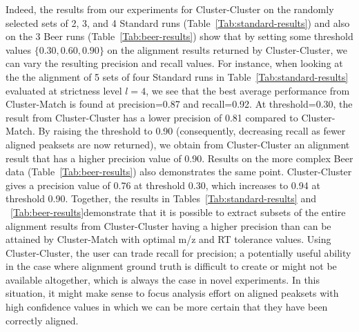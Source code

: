 Indeed, the results from our experiments for Cluster-Cluster on the randomly selected sets of 2, 3, and 4 Standard runs (Table~\ref{Tab:standard-results}) and also on the 3 Beer runs (Table~\ref{Tab:beer-results}) show that by setting some threshold values $\{0.30, 0.60, 0.90\}$ on the alignment results returned by Cluster-Cluster, we can vary the resulting precision and recall values. For instance, when looking at the the alignment of 5 sets of four Standard runs in Table~\ref{Tab:standard-results} evaluated at strictness level $l=4$, we see that the best average performance from Cluster-Match is found at precision=0.87 and recall=0.92. At threshold=0.30, the result from Cluster-Cluster has a lower precision of 0.81 compared to Cluster-Match. By raising the threshold to 0.90 (consequently, decreasing recall as fewer aligned peaksets are now returned), we obtain from Cluster-Cluster an alignment result that has a higher precision value of 0.90. Results on the more complex Beer data (Table~\ref{Tab:beer-results}) also demonstrates the same point. Cluster-Cluster gives a precision value of 0.76 at threshold 0.30, which increases to 0.94 at threshold 0.90. Together, the results in Tables~\ref{Tab:standard-results} and ~\ref{Tab:beer-results}demonstrate that it is possible to extract subsets of the entire alignment results from Cluster-Cluster having a higher precision than can be attained by Cluster-Match with optimal m/z and RT tolerance values. Using Cluster-Cluster, the user can trade recall for precision; a potentially useful ability in the case where alignment ground truth is difficult to create or might not be available altogether, which is always the case in novel experiments. In this situation, it might make sense to focus analysis effort on aligned peaksets with high confidence values in which we can be more certain that they have been correctly aligned.

